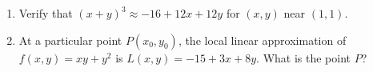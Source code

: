 \documentclass[12pt]{article}
\newif\ifans
\begin{document}
\begin{enumerate}
\ifans{\fbox{\parbox{1\linewidth}{Show that the local linear approximation to $f(x,y)=e^x\cos{y}$ at the point $(0,0)$ is $L(x,y)=1+x$}}}\fi

\item Verify that $(x+y)^3 \approx -16+12x+12y$ for $(x,y)$ near $(1,1)$.

\ifans{\fbox{\parbox{1\linewidth}{Show that the local linear approximation to $f(x,y)=(x+y)^3$ at the point $(1,1)$ is $L(x,y)=-16+12x+12y$}}}\fi

\item At a particular point $P(x_0,y_0)$, the local linear approximation of $f(x,y)=xy+y^2$ is $L(x,y)=-15+3x+8y$.  What is the point $P$?

\ifans{\fbox{$(2,3)$}}\fi

\end{enumerate}
\end{document}

